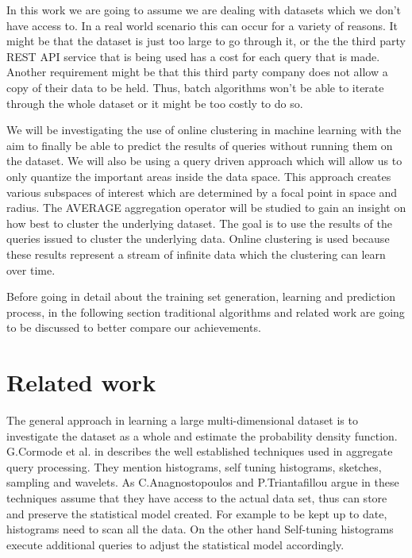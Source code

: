 \documentclass{lmproj}
\begin{document}
In this work we are going to assume we are dealing with datasets which we don't have access to. In a real world scenario this can occur for a variety of reasons. It might be that the dataset is just too large to go through it, or the the third party REST API service that is being used has a cost for each query that is made. Another requirement might be that this third party company does not allow a copy of their data to be held. Thus, batch algorithms won't be able to iterate through the whole dataset or it might be too costly to do so. 

We will be investigating the use of online clustering in machine learning with the aim to finally be able to predict the results of queries without running them on the dataset. We will also be using a query driven approach \cite{LearningDNN} which will allow us to only quantize the important areas inside the data space. This approach creates various subspaces of interest  which are determined by a focal point in space and radius. The AVERAGE aggregation operator will be studied to gain an insight on how best to cluster the underlying dataset. The goal is to use the results of the queries issued to cluster the underlying data. Online clustering is used because these results represent a stream of infinite data which the clustering can learn over time.

Before going in detail about the training set generation, learning and prediction process, in the following section traditional algorithms and related work are going to be discussed to better compare our achievements.

\chapter{Related work}
\label{relatedWork}
The general approach in learning a large multi-dimensional dataset is to investigate the dataset as a whole and estimate the probability density function. G.Cormode et al. in \cite{Synopses} describes the well established techniques used in aggregate query processing. They mention histograms, self tuning histograms, sketches, sampling and wavelets. As C.Anagnostopoulos and P.Triantafillou argue in \cite{learningCount} these techniques assume that they have access to the actual data set, thus can store and preserve the statistical model created. For example to be kept up to date, histograms need to scan all the data. On the other hand Self-tuning histograms execute additional queries to adjust the statistical model accordingly.
\end{document}
